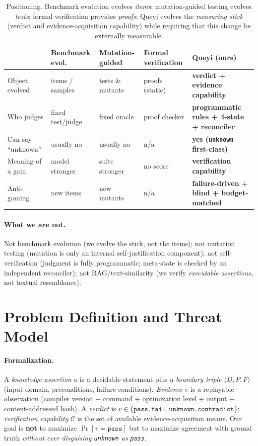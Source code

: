 \documentclass{article}
\begin{document}
\begin{table}[t]
\caption{Positioning. Benchmark evolution evolves \emph{items}; mutation-guided testing evolves
\emph{tests}; formal verification provides \emph{proofs}; Queyi evolves the \emph{measuring stick}
(verdict and evidence-acquisition capability) while requiring that this change be externally
measurable.}
\label{tab:positioning}
\centering
\small
\begin{tabular}{@{}p{2.4cm}p{2.6cm}p{2.6cm}p{2.6cm}p{3.4cm}@{}}
\toprule
 & Benchmark evol. & Mutation-guided & Formal verification & \textbf{Queyi (ours)} \\
\midrule
Object evolved & items / samples & tests \& mutants & proofs (static) & \textbf{verdict + evidence capability} \\
Who judges & fixed test/judge & fixed oracle & proof checker & \textbf{programmatic rules + 4-state + reconciler} \\
Can say ``unknown'' & usually no & usually no & n/a & \textbf{yes (\texttt{unknown} first-class)} \\
Meaning of a gain & model stronger & suite stronger & no score & \textbf{verification capability} \\
Anti-gaming & new items & new mutants & n/a & \textbf{failure-driven + blind + budget-matched} \\
\bottomrule
\end{tabular}
\end{table}

\paragraph{What we are not.} Not benchmark evolution (we evolve the stick, not the items); not
mutation testing (mutation is only an internal self-justification component); not
self-verification (judgment is fully programmatic; meta-state is checked by an independent
reconciler); not RAG/text-similarity (we verify \emph{executable assertions}, not textual
resemblance).

\section{Problem Definition and Threat Model}
\label{sec:threat}
\paragraph{Formalization.}
A \emph{knowledge assertion} $a$ is a decidable statement plus a \emph{boundary triple}
$\langle D, P, F\rangle$ (input domain, preconditions, failure conditions). \emph{Evidence} $e$ is
a replayable observation (compiler version $+$ command $+$ optimization level $+$ output $+$
content-addressed hash). A \emph{verdict} is $v\in\{\texttt{pass},\texttt{fail},\texttt{unknown},
\texttt{contradict}\}$; \emph{verification capability} $\mathcal{C}$ is the set of available
evidence-acquisition means. Our goal is \textbf{not} to maximize $\Pr[v{=}\texttt{pass}]$ but to
maximize agreement with ground truth \emph{without ever disguising \texttt{unknown} as \texttt{pass}}.
\end{document}
